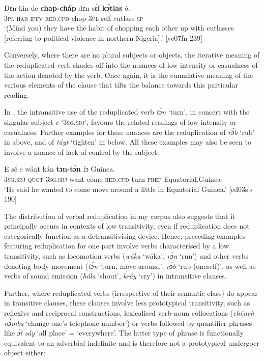 \ea%
    \label{ex:key:142}
    \gll Dɛn  kin  de  \textbf{chap-cháp}  dɛn  sɛ́f  \textbf{kɔ́tlas}  ó.\\
\textsc{3pl}  \textsc{hab}  \textsc{ipfv}  \textsc{red.cpd-}chop  \textsc{3pl}  self  cutlass  \textsc{sp}\\

\glt ‘(Mind you) they have the habit of chopping each other up with cutlasses
[referring to political violence in northern Nigeria].’ [ye07fn 239]
\z

Conversely, where there are no plural subjects or objects, the iterative meaning of the reduplicated verb shades off into the nuances of low intensity or casualness of the action denoted by the verb. Once again, it is the cumulative meaning of the various elements of the clause that tilts the balance towards this particular reading. 


In , the intransitive use of the reduplicated verb \textit{tɔ́n} ‘turn’, in concert with the singular subject \textit{e} ‘\textsc{3sg.sbj}’, favours the related readings of low intensity or casualness. Further examples for these nuances are the reduplication of \textit{rɔ́b} ‘rub’ in  above, and of \textit{táyt} ‘tighten’ in  below. All these examples may also be seen to involve a nuance of lack of control by the subject:



\ea%
    \label{ex:key:143}
    \gll E    sé    e    wánt  kán    \textbf{tɔn-tɔ́n} fɔ  Guinea.\\
\textsc{3sg.sbj}  \textsc{quot}    \textsc{3sg.sbj}  want  come  \textsc{red.cpd-}turn  \textsc{prep}  Equatorial.Guinea\\

\glt ‘He said he wanted to come move around a little in Equatorial Guinea.’ [ed03sb 190]
\z

The distribution of verbal reduplication in my corpus also suggests that it principally occurs in contexts of low transitivity, even if reduplication does not categorically function as a detransitivising device. Hence, preceding examples featuring reduplication for one part involve verbs characterised by a low transitivity, such as locomotion verbs (\textit{wáka} ‘wáka’, \textit{rɔ́n} ‘run’) and other verbs denoting body movement (\textit{tɔ́n} ‘turn, move around’, \textit{rɔ́b} ‘rub (oneself)’, as well as verbs of sound emission (\textit{hála} ‘shout’, \textit{kráy} ‘cry’) in intransitive clauses. 


Further, where reduplicated verbs (irrespective of their semantic class) do appear in transitive clauses, these clauses involve less prototypical transitivity, such as reflexive and reciprocal constructions, lexicalised verb-noun collocations (\textit{chénch} \textit{nɔ́mba} ‘change one’s telephone number’) or verbs followed by quantifier phrases like \textit{ɔ́l sáy} ‘all place’ = ‘everywhere’. The latter type of phrase is functionally equivalent to an adverbial indefinite and is therefore not a prototypical undergoer object either: 



